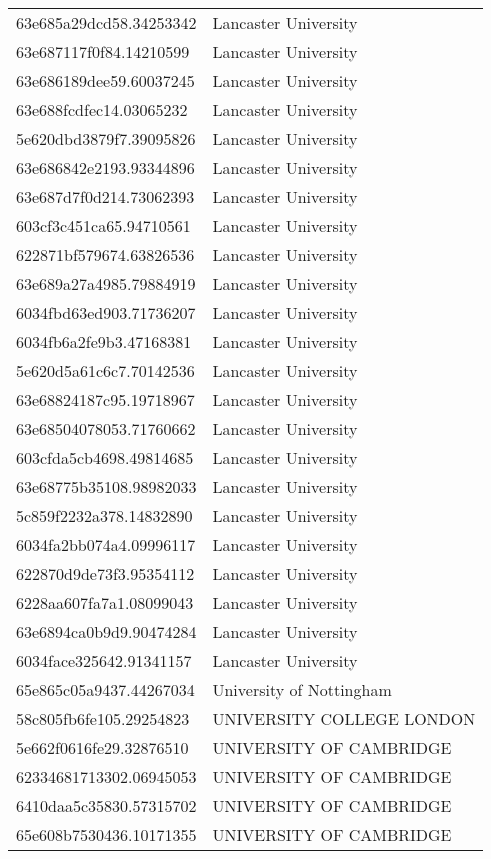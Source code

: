 \begin{tabular}{ll}
63e685a29dcd58.34253342 & Lancaster University \\
63e687117f0f84.14210599 & Lancaster University \\
63e686189dee59.60037245 & Lancaster University \\
63e688fcdfec14.03065232 & Lancaster University \\
5e620dbd3879f7.39095826 & Lancaster University \\
63e686842e2193.93344896 & Lancaster University \\
63e687d7f0d214.73062393 & Lancaster University \\
603cf3c451ca65.94710561 & Lancaster University \\
622871bf579674.63826536 & Lancaster University \\
63e689a27a4985.79884919 & Lancaster University \\
6034fbd63ed903.71736207 & Lancaster University \\
6034fb6a2fe9b3.47168381 & Lancaster University \\
5e620d5a61c6c7.70142536 & Lancaster University \\
63e68824187c95.19718967 & Lancaster University \\
63e68504078053.71760662 & Lancaster University \\
603cfda5cb4698.49814685 & Lancaster University \\
63e68775b35108.98982033 & Lancaster University \\
5c859f2232a378.14832890 & Lancaster University \\
6034fa2bb074a4.09996117 & Lancaster University \\
622870d9de73f3.95354112 & Lancaster University \\
6228aa607fa7a1.08099043 & Lancaster University \\
63e6894ca0b9d9.90474284 & Lancaster University \\
6034face325642.91341157 & Lancaster University \\
65e865c05a9437.44267034 & University of Nottingham \\
58c805fb6fe105.29254823 & UNIVERSITY COLLEGE LONDON \\
5e662f0616fe29.32876510 & UNIVERSITY OF CAMBRIDGE \\
62334681713302.06945053 & UNIVERSITY OF CAMBRIDGE \\
6410daa5c35830.57315702 & UNIVERSITY OF CAMBRIDGE \\
65e608b7530436.10171355 & UNIVERSITY OF CAMBRIDGE \\

\end{tabular}

